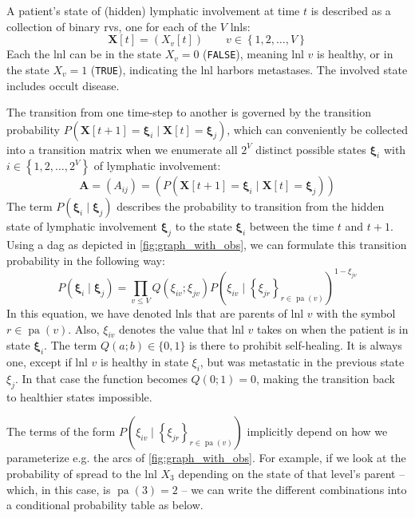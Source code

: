 \documentclass[twocolumn]{aastex631}
\begin{document}
A patient's state of (hidden) lymphatic involvement at time $t$ is described as a collection of binary \glspl{rv}, one for each of the $V$ \glspl{lnl}:
%
\begin{equation}
    \mathbf{X}[t] = \left( X_v[t] \right) \qquad v \in \left\{ 1,2, \ldots, V \right\}
\end{equation}
%
Each the \gls{lnl} can be in the state $X_v=0$ (\texttt{FALSE}), meaning \gls{lnl} $v$ is healthy, or in the state $X_v=1$ (\texttt{TRUE}), indicating the \gls{lnl} harbors metastases. The involved state includes occult disease.

The transition from one time-step to another is governed by the transition probability $P\left( \mathbf{X}[t+1]=\boldsymbol{\xi}_i \mid \mathbf{X}[t]=\boldsymbol{\xi}_j \right)$, which can conveniently be collected into a transition matrix when we enumerate all $2^V$ distinct possible states $\boldsymbol{\xi}_i$ with $i \in \left\{ 1,2, \ldots, 2^V \right\}$ of lymphatic involvement:
%
\begin{equation}
    \mathbf{A} = \left( A_{ij} \right) = \left( P\left( \mathbf{X}[t+1]=\boldsymbol{\xi}_i \mid \mathbf{X}[t]=\boldsymbol{\xi}_j \right) \right)
\end{equation}
%
The term $P\left( \boldsymbol{\xi}_i \mid \boldsymbol{\xi}_j \right)$ describes the probability to transition from the hidden state of lymphatic involvement $\boldsymbol{\xi}_j$ to the state $\boldsymbol{\xi}_i$ between the time $t$ and $t+1$. Using a \gls{dag} as depicted in \cref{fig:graph_with_obs}, we can formulate this transition probability in the following way:
%
\begin{equation}
    \label{eq:transition_prob}
    P\left( \boldsymbol{\xi}_i \mid \boldsymbol{\xi}_j \right) = \prod_{v \leq V} Q\left( \xi_{iv} ; \xi_{jv} \right) P \left( \xi_{iv} \mid \left\{ \xi_{jr} \right\}_{r \in \operatorname{pa}(v)} \right)^{1 - \xi_{jv}}
\end{equation}
%
In this equation, we have denoted \glspl{lnl} that are parents of \gls{lnl} $v$ with the symbol $r\in\operatorname{pa}(v)$. Also, $\xi_{iv}$ denotes the value that \gls{lnl} $v$ takes on when the patient is in state $\boldsymbol{\xi}_i$. The term $Q(a;b) \in \{ 0,1 \}$ is there to prohibit self-healing. It is always one, except if \gls{lnl} $v$ is healthy in state $\xi_i$, but was metastatic in the previous state $\xi_j$. In that case the function becomes $Q(0;1) = 0$, making the transition back to healthier states impossible.

The terms of the form $P \left( \xi_{iv} \mid \left\{ \xi_{jr} \right\}_{r \in \operatorname{pa}(v)} \right)$ implicitly depend on how we parameterize e.g. the arcs of \cref{fig:graph_with_obs}. For example, if we look at the probability of spread to the \gls{lnl} $X_3$ depending on the state of that level's parent -- which, in this case, is $\operatorname{pa}(3) = 2$ -- we can write the different combinations into a conditional probability table as below.
\end{document}
